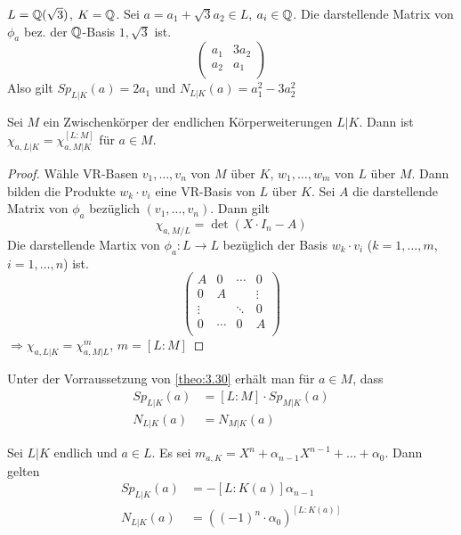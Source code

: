 \documentclass[../main.tex]{subfiles}
\begin{document}
\begin{example}
    $L=\mathbb{Q}(\sqrt{3})$, $K=\mathbb{Q}$.
    Sei $a = a_1+\sqrt{3}a_2\in L$, $a_i \in \mathbb{Q}$.
    Die darstellende Matrix von $\phi_a$ bez. der $\mathbb{Q}$-Basis $1,\sqrt{3}$ ist.
    $$\begin{pmatrix}
        a_1& 3a_2\\
        a_2& a_1\\
    \end{pmatrix}$$
    Also gilt $Sp_{L|K}(a)=2a_1$ und $N_{L|K}(a) = a_1^2-3a_2^2$
\end{example}
\begin{lemma}\label{theo:3.30}
    Sei $M$ ein Zwischenkörper der endlichen Körperweiterungen $L|K$. Dann ist
    $\chi_{a,L|K} = \chi_{a,M|K}^{[L:M]}$ für $a\in M$.
\end{lemma}
\begin{proof}
    Wähle VR-Basen %
    $v_1,\dots,v_n$ von $M$ über $K$,
    $w_1,\dots,w_m$ von $L$ über $M$.
    Dann bilden die Produkte $w_k\cdot v_i$ eine VR-Basis von $L$ über $K$. 
    Sei $A$ die darstellende Matrix von $\phi_a$ bezüglich $(v_1,\dots,v_n)$.
    Dann gilt
    $$\chi_{a,M/L} = \det(X\cdot I_n-A)$$
    Die darstellende Martix von $\phi_a:L\rightarrow L$ bezüglich der Basis $w_k\cdot v_i$ ($k=1,\dots,m$, $i=1,\dots,n$) ist.
    $$\begin{pmatrix}
        A& 0 & \cdots & 0\\
        0& A &   & \vdots\\
        \vdots&  & \ddots & 0\\
        0& \cdots & 0 & A\\
    \end{pmatrix}$$
    $\Rightarrow \chi_{a,L|K} =\chi_{a,M|L}^m$, $m=[L:M]$
\end{proof}
\begin{remark}
    Unter der Vorraussetzung von \ref{theo:3.30} erhält man für $a\in M$, dass 
    \begin{align*}
        Sp_{L|K}(a) &= [L:M]\cdot Sp_{M|K}(a)\\
        N_{L|K}(a) &= N_{M|K}(a)
    \end{align*}
\end{remark}
\begin{theorem} \label{theo:3.32}
    Sei $L|K$ endlich und $a\in L$.
    Es sei $m_{a,K} = X^n+\alpha_{n-1}X^{n-1}+\dots +\alpha_0$.
    Dann gelten
    \begin{align*}
        Sp_{L|K}(a) &= -[L:K(a)]\alpha_{n-1}\\
        N_{L|K} (a) &= \left(\left(-1\right)^n\cdot \alpha_0\right)^{[L:K(a)]}
    \end{align*}
\end{theorem}
\end{document}
